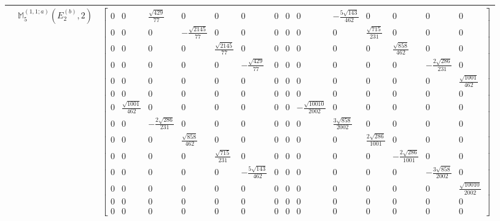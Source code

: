\documentclass[fleqn,8pt,landscape]{jsarticle}
\begin{document}
\begin{longtable}{ccc}
$  $ & $ \mathbb{M}_{5}^{(1,1;a)}(E_{2}^{(b)},2) $ & $ \begin{bmatrix} 0 & 0 & \frac{\sqrt{429}}{77} & 0 & 0 & 0 & 0 & 0 & 0 & - \frac{5 \sqrt{143}}{462} & 0 & 0 & 0 & 0 \\ 0 & 0 & 0 & - \frac{\sqrt{2145}}{77} & 0 & 0 & 0 & 0 & 0 & 0 & \frac{\sqrt{715}}{231} & 0 & 0 & 0 \\ 0 & 0 & 0 & 0 & \frac{\sqrt{2145}}{77} & 0 & 0 & 0 & 0 & 0 & 0 & \frac{\sqrt{858}}{462} & 0 & 0 \\ 0 & 0 & 0 & 0 & 0 & - \frac{\sqrt{429}}{77} & 0 & 0 & 0 & 0 & 0 & 0 & - \frac{2 \sqrt{286}}{231} & 0 \\ 0 & 0 & 0 & 0 & 0 & 0 & 0 & 0 & 0 & 0 & 0 & 0 & 0 & \frac{\sqrt{1001}}{462} \\ 0 & 0 & 0 & 0 & 0 & 0 & 0 & 0 & 0 & 0 & 0 & 0 & 0 & 0 \\ 0 & \frac{\sqrt{1001}}{462} & 0 & 0 & 0 & 0 & 0 & 0 & - \frac{\sqrt{10010}}{2002} & 0 & 0 & 0 & 0 & 0 \\ 0 & 0 & - \frac{2 \sqrt{286}}{231} & 0 & 0 & 0 & 0 & 0 & 0 & \frac{3 \sqrt{858}}{2002} & 0 & 0 & 0 & 0 \\ 0 & 0 & 0 & \frac{\sqrt{858}}{462} & 0 & 0 & 0 & 0 & 0 & 0 & \frac{2 \sqrt{286}}{1001} & 0 & 0 & 0 \\ 0 & 0 & 0 & 0 & \frac{\sqrt{715}}{231} & 0 & 0 & 0 & 0 & 0 & 0 & - \frac{2 \sqrt{286}}{1001} & 0 & 0 \\ 0 & 0 & 0 & 0 & 0 & - \frac{5 \sqrt{143}}{462} & 0 & 0 & 0 & 0 & 0 & 0 & - \frac{3 \sqrt{858}}{2002} & 0 \\ 0 & 0 & 0 & 0 & 0 & 0 & 0 & 0 & 0 & 0 & 0 & 0 & 0 & \frac{\sqrt{10010}}{2002} \\ 0 & 0 & 0 & 0 & 0 & 0 & 0 & 0 & 0 & 0 & 0 & 0 & 0 & 0 \\ 0 & 0 & 0 & 0 & 0 & 0 & 0 & 0 & 0 & 0 & 0 & 0 & 0 & 0 \end{bmatrix} $ \\ \hline
\end{longtable}
\end{document}
